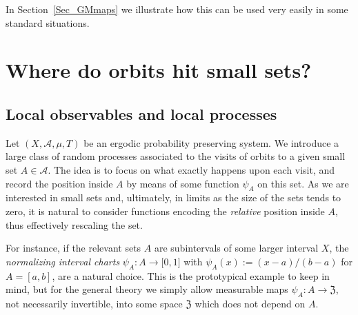 \documentclass[10pt]{amsart}
\theoremstyle{definition}\newtheorem{defi}[theo]{Definition}\newtheorem{rema}[theo]{Remark}\newtheorem{exam}[theo]{Example}\newtheorem{exem}[theo]{Example}\newtheorem{nota}[theo]{Notation}
\newcommand{\clA}{\mathcal{A}}
\newcommand{\frkZ}{\mathfrak{Z}}
\begin{document}
In Section~\ref{Sec_GMmaps} we illustrate how this can be used very easily in some standard situations.



\section{Where do orbits hit small sets?}

\subsection{Local observables and local processes}
Let $(X,\clA,\mu,T)$ be an ergodic probability preserving system. We introduce a large class of random processes associated to the visits of orbits to a given small set $A\in\clA$. The idea is to focus on what exactly happens upon each visit, and record the position inside $A$ by means of some function $\psi_{A}$ on this set. As we are interested in small sets and, ultimately, in limits as the size of the sets tends to zero, it is natural to consider functions encoding the \emph{relative} position inside $A$, thus effectively rescaling the set.

For instance, if the relevant sets $A$ are subintervals of some larger interval $X$, the \emph{normalizing interval charts} $\psi_{A}:A\rightarrow
\lbrack0,1]$ with $\psi_{A}(x):=(x-a)/(b-a)$ for $A=[a,b]$, are a natural choice. This is the prototypical example to keep in mind, but for the general theory we simply allow measurable maps $\psi_{A}:A\rightarrow\frkZ$, not necessarily invertible, into some space $\frkZ$ which does not depend on $A$.
\end{document}
